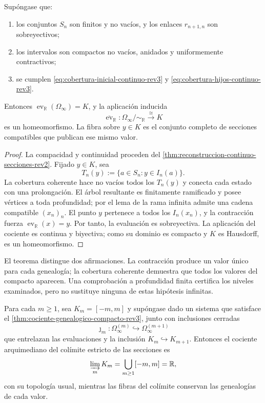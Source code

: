 \begin{theorem}
\label{thm:cociente-genealogico-compacto-rev3}
Supóngase que:
\begin{enumerate}
\item los conjuntos \(S_n\) son finitos y no vacíos, y los enlaces
      \(r_{n+1,n}\) son sobreyectivos;
\item los intervalos son compactos no vacíos, anidados y uniformemente
      contractivos;
\item se cumplen
      \eqref{eq:cobertura-inicial-continuo-rev3} y
      \eqref{eq:cobertura-hijos-continuo-rev3}.
\end{enumerate}
Entonces \(\operatorname{ev}_{\mathbb R}(\Omega_\infty)=K\), y la aplicación
inducida
\begin{equation}
 \overline{\operatorname{ev}}_{\mathbb R}:
 \Omega_\infty/\!\sim_{\mathbb R}\xrightarrow{\ \cong\ }K
 \label{eq:homeomorfismo-cociente-continuo-rev3}
\end{equation}
es un homeomorfismo. La fibra sobre \(y\in K\) es el conjunto completo de
secciones compatibles que publican ese mismo valor.
\end{theorem}

\begin{proof}
La compacidad y continuidad proceden del
\cref{thm:reconstruccion-continuo-secciones-rev2}. Fijado \(y\in K\), sea
\[
 T_n(y):=\{a\in S_n:y\in I_n(a)\}.
\]
La cobertura coherente hace no vacíos todos los \(T_n(y)\) y conecta cada
estado con una prolongación. El árbol resultante es finitamente ramificado y
posee vértices a toda profundidad; por el lema de la rama infinita admite una
cadena compatible \((x_n)_n\). El punto \(y\) pertenece a todos los
\(I_n(x_n)\), y la contracción fuerza
\(\operatorname{ev}_{\mathbb R}(x)=y\). Por tanto, la evaluación es
sobreyectiva. La aplicación del cociente es continua y biyectiva; como su
dominio es compacto y \(K\) es Hausdorff, es un homeomorfismo.
\end{proof}

El teorema distingue dos afirmaciones. La contracción produce un valor único
para cada genealogía; la cobertura coherente demuestra que todos los valores
del compacto aparecen. Una comprobación a profundidad finita certifica los
niveles examinados, pero no sustituye ninguna de estas hipótesis infinitas.

\begin{proposition}
\label{prop:atlas-genealogico-recta-real-rev3}
Para cada \(m\geq1\), sea \(K_m=[-m,m]\) y supóngase dado un sistema que
satisface el \cref{thm:cociente-genealogico-compacto-rev3}, junto con
inclusiones cerradas
\[
 \jmath_m:\Omega_\infty^{(m)}\hookrightarrow\Omega_\infty^{(m+1)}
\]
que entrelazan las evaluaciones y la inclusión
\(K_m\hookrightarrow K_{m+1}\). Entonces el cociente arquimediano del
colímite estricto de las secciones es
\[
 \varinjlim_m K_m=\bigcup_{m\geq1}[-m,m]=\mathbb R,
\]
con su topología usual, mientras las fibras del colímite conservan las
genealogías de cada valor.
\end{proposition}

